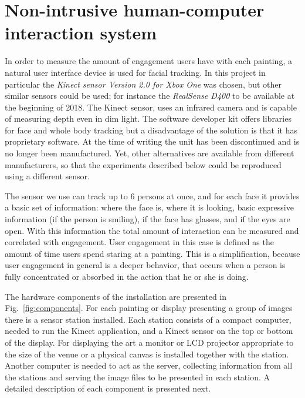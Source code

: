 \documentclass[graybox]{svmult}
\begin{document}
\section{Non-intrusive human-computer interaction system}
\label{interaction}
In order to measure the amount of engagement users have with each painting,
a natural user interface device is used for facial tracking. In this project in particular the \textit{ Kinect sensor Version 2.0 for Xbox One} was chosen, but other similar sensors could be used; for instance the \textit{RealSense D400} to be available at the beginning of 2018. The Kinect sensor, uses an infrared camera and is capable of measuring depth even in dim light. The software developer kit offers libraries for face and whole body tracking but a disadvantage of the solution is that it has proprietary software. At the time of writing the unit has been discontinued and is no longer been manufactured\cite{kinectOut}. Yet, other alternatives are available from different manufacturers, so that the experiments described below could be reproduced using a different sensor.

The sensor we use can track up to 6 persons at once, and for each face it provides a basic set of information: where the face is, where it is looking, basic expressive information (if the person is smiling), if the face has glasses, and if the eyes are open.  With this information the total amount of interaction can be measured and correlated with engagement. User engagement in this case is defined as the amount of time users spend staring at a painting. This is a simplification, because user engagement in general is a deeper behavior, that occurs when a person is fully concentrated or absorbed in the action that he or she is doing. 


The hardware components of the installation are presented in Fig.~\ref{fig:components}. For each painting or display presenting a group of images there is a sensor station installed.  Each station consists of a compact computer, needed to run the Kinect application, and a Kinect sensor on the top or bottom of the display. For displaying the art a monitor or LCD projector appropriate to the size of the venue or a physical canvas is installed together with the station. Another computer is needed to act as the server, collecting information from all the stations and serving the image files to be presented in each station. A detailed description of each component is presented next.
\end{document}
